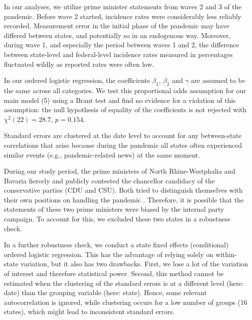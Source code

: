 \documentclass[authoryear,12pt, 3p]{elsarticle} %
\theoremstyle{break}
\begin{document}
In our analyses, we utilize prime minister statements from waves 2 and 3 of the pandemic. Before wave 2 started, incidence rates were considerably less reliably recorded. Measurement error in the initial phase of the pandemic may have differed between states, and potentially so in an endogenous way. Moreover, during wave 1, and especially the period between waves 1 and 2, the difference between state-level and federal-level incidence rates measured in percentages fluctuated wildly as reported rates were often low.

In our ordered logistic regression, the coefficients $\beta_1$, $\beta_2$ and $\gamma$ are assumed to be the same across all categories. We test this proportional odds assumption for our main model (5) using a Brant test \citep{Brant1990} and find no evidence for a violation of this assumption: the null hypothesis of equality of the coefficients is not rejected with $\chi^2 (22) = 28.7$, $p = 0.154$. 

Standard errors are clustered at the date level to account for any between-state correlations that arise because during the pandemic all states often experienced similar events (e.g., pandemic-related news) at the same moment.  

During our study period, the prime ministers of North Rhine-Westphalia and Bavaria fiercely and publicly contested the chancellor candidacy of the conservative parties (CDU and CSU). Both tried to distinguish themselves with their own positions on handling the pandemic \citep{Jun2023}. Therefore, it is possible that the statements of these two prime ministers were biased by the internal party campaign. To account for this, we excluded these two states in a robustness check.

In a further robustness check, we conduct a state fixed effects (conditional) ordered logistic regression. This has the advantage of relying solely on within-state variation, but it also has two drawbacks. First, we lose a lot of the variation of interest and therefore statistical power. Second, this method cannot be estimated when the clustering of the standard errors is at a different level (here: date) than the grouping variable (here: state). Hence, some relevant autocorrelation is ignored, while clustering occurs for a low number of groups (16 states), which might lead to inconsistent standard errors.
\end{document}
